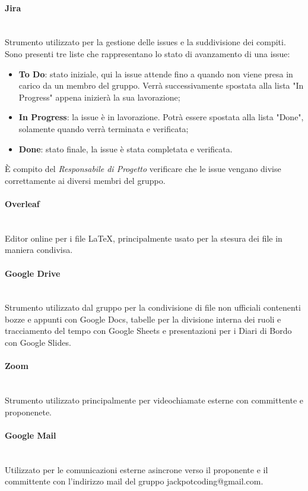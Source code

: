 \documentclass{article}
\begin{document}
\paragraph{Jira}~\\
Strumento utilizzato per la gestione delle issues e la suddivisione dei compiti. Sono presenti tre liste che rappresentano lo stato di avanzamento di una issue:
\begin{itemize} 
    \item\textbf{To Do}: stato iniziale, qui la issue attende fino a quando non viene presa in carico da un membro del gruppo. Verrà successivamente spostata alla lista "In Progress" appena inizierà la sua lavorazione;
    \item\textbf{In Progress}: la issue è in lavorazione. Potrà essere spostata alla lista "Done", solamente quando verrà terminata e verificata;
    \item\textbf{Done}: stato finale, la issue è stata completata e verificata.
\end{itemize}
È compito del \textit{Responsabile di Progetto} verificare che le issue vengano divise correttamente ai diversi membri del gruppo. 
\paragraph{Overleaf}~\\
Editor online per i file LaTeX, principalmente usato per la stesura dei file in maniera condivisa.
\paragraph{Google Drive}~\\
Strumento utilizzato dal gruppo per la condivisione di file non ufficiali contenenti bozze e appunti con Google Docs, tabelle per la divisione interna dei ruoli e tracciamento del tempo con Google Sheets e presentazioni per i Diari di Bordo con Google Slides. 
\paragraph{Zoom}~\\
Strumento utilizzato principalmente per videochiamate esterne con committente e proponenete.
\paragraph{Google Mail}~\\
Utilizzato per le comunicazioni esterne asincrone verso il proponente e il committente con l'indirizzo mail del gruppo jackpotcoding@gmail.com.
\end{document}
